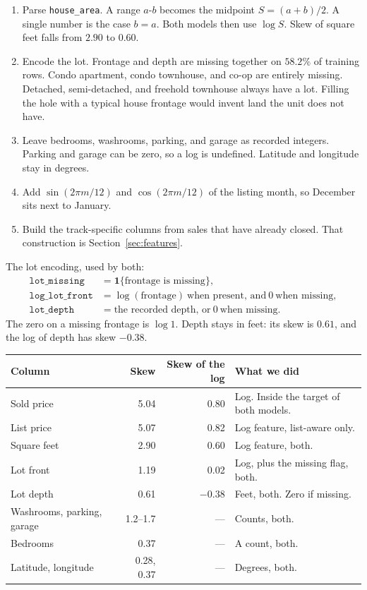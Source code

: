 \documentclass[11pt]{article}
\newcommand{\la}{list-aware}
\begin{document}
\begin{enumerate}
\item Parse \texttt{house\_area}. A range \(a\)-\(b\) becomes the midpoint \(S=(a+b)/2\). A single number is the case \(b=a\). Both models then use \(\log S\). Skew of square feet falls from \(2.90\) to \(0.60\).
\item Encode the lot. Frontage and depth are missing together on \(58.2\%\) of training rows. Condo apartment, condo townhouse, and co-op are entirely missing. Detached, semi-detached, and freehold townhouse always have a lot. Filling the hole with a typical house frontage would invent land the unit does not have.
\item Leave bedrooms, washrooms, parking, and garage as recorded integers. Parking and garage can be zero, so a log is undefined. Latitude and longitude stay in degrees.
\item Add \(\sin(2\pi m/12)\) and \(\cos(2\pi m/12)\) of the listing month, so December sits next to January.
\item Build the track-specific columns from sales that have already closed. That construction is Section~\ref{sec:features}.
\end{enumerate}

The lot encoding, used by both:
\begin{align*}
\texttt{lot\_missing} &= \mathbf{1}\{\text{frontage is missing}\},\\
\texttt{log\_lot\_front} &= \log(\text{frontage})\ \text{when present, and}\ 0\ \text{when missing},\\
\texttt{lot\_depth} &= \text{the recorded depth, or}\ 0\ \text{when missing}.
\end{align*}
The zero on a missing frontage is \(\log 1\). Depth stays in feet: its skew is \(0.61\), and the log of depth has skew \(-0.38\).

\begin{center}
\small
\begin{tabular}{lrrl}
\toprule
Column & Skew & Skew of the log & What we did \\
\midrule
Sold price & 5.04 & 0.80 & Log. Inside the target of both models. \\
List price & 5.07 & 0.82 & Log feature, \la{} only. \\
Square feet & 2.90 & 0.60 & Log feature, both. \\
Lot front & 1.19 & 0.02 & Log, plus the missing flag, both. \\
Lot depth & 0.61 & \(-0.38\) & Feet, both. Zero if missing. \\
Washrooms, parking, garage & 1.2--1.7 & --- & Counts, both. \\
Bedrooms & 0.37 & --- & A count, both. \\
Latitude, longitude & 0.28, 0.37 & --- & Degrees, both. \\
\bottomrule
\end{tabular}
\end{center}
\end{document}

